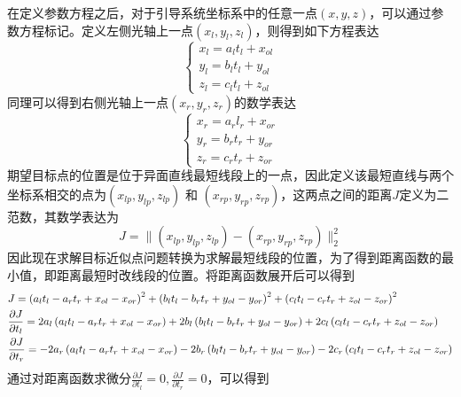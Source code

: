 在定义参数方程之后，对于引导系统坐标系中的任意一点$(x,y,z)$，可以通过参数方程标记。定义左侧光轴上一点$(x_l,y_l,z_l)$，则得到如下方程表达
\begin{equation}  
\left\{ 
\begin{array}{lll} 
x_l = a_l t_l + x_{ol} \\
y_l = b_l t_l + y_{ol} \\
z_l = c_l t_l + z_{ol}
\end{array} 
\right.
\end{equation}
同理可以得到右侧光轴上一点$(x_r,y_r,z_r)$的数学表达
\begin{equation}  
\left\{ 
\begin{array}{lll} 
x_r = a_r l_r + x_{or} \\
y_r = b_r t_r + y_{or} \\
z_r = c_r t_r + z_{or}
\end{array} 
\right.
\end{equation}
期望目标点的位置是位于异面直线最短线段上的一点，因此定义该最短直线与两个坐标系相交的点为$(x_{lp}, y_{lp}, z_{lp})$ 和 $(x_{rp}, y_{rp}, z_{rp})$，这两点之间的距离$J$定义为二范数，其数学表达为
\begin{equation}
J = \|(x_{lp}, y_{lp}, z_{lp}) - (x_{rp}, y_{rp}, z_{rp}) \|_2^2
\end{equation}
因此现在求解目标近似点问题转换为求解最短线段的位置，为了得到距离函数的最小值，即距离最短时改线段的位置。将距离函数展开后可以得到
\begin{equation}  	
\begin{gathered}
J = {\left( {{a_l}{t_l} - {a_r}{t_r} + {x_{ol}} - {x_{or}}} \right)^2} + {\left( {{b_l}{t_l} - {b_r}{t_r} + {y_{ol}} - {y_{or}}} \right)^2} + {\left( {{c_l}{t_l} - {c_r}{t_r} + {z_{ol}} - {z_{or}}} \right)^2} \hfill \\
\frac{{\partial J}}{{\partial {t_l}}} = 2{a_l}\left( {{a_l}{t_l} - {a_r}{t_r} + {x_{ol}} - {x_{or}}} \right) + 2{b_l}\left( {{b_l}{t_l} - {b_r}{t_r} + {y_{ol}} - {y_{or}}} \right) + 2{c_l}\left( {{c_l}{t_l} - {c_r}{t_r} + {z_{ol}} - {z_{or}}} \right) \hfill \\
\frac{{\partial J}}{{\partial {t_r}}} =  - 2{a_r}\left( {{a_l}{t_l} - {a_r}{t_r} + {x_{ol}} - {x_{or}}} \right) - 2{b_r}\left( {{b_l}{t_l} - {b_r}{t_r} + {y_{ol}} - {y_{or}}} \right) - 2{c_r}\left( {{c_l}{t_l} - {c_r}{t_r} + {z_{ol}} - {z_{or}}} \right) \hfill \\ 
\end{gathered}
\end{equation}
通过对距离函数求微分$\frac{{\partial J}}{{\partial {t_l}}} = 0,\frac{{\partial J}}{{\partial {t_r}}} = 0$，可以得到
